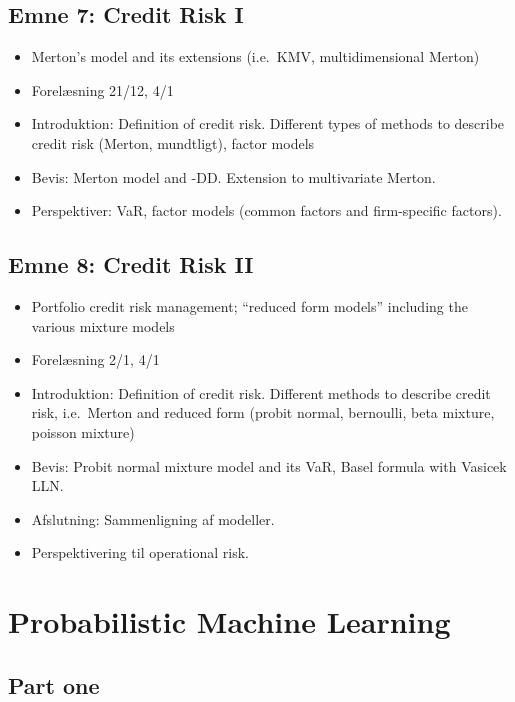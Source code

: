 \documentclass[
]{book}
\providecommand{\tightlist}{%
  \setlength{\itemsep}{0pt}\setlength{\parskip}{0pt}}
\begin{document}
\hypertarget{emne-7-credit-risk-i}{%
\section{Emne 7: Credit Risk I}\label{emne-7-credit-risk-i}}

\begin{itemize}
\tightlist
\item
  Merton's model and its extensions (i.e.~KMV, multidimensional Merton)
\item
  Forelæsning 21/12, 4/1
\item
  Introduktion: Definition of credit risk. Different types of methods to describe credit risk (Merton, mundtligt), factor models
\item
  Bevis: Merton model and -DD. Extension to multivariate Merton.
\item
  Perspektiver: VaR, factor models (common factors and firm-specific factors).
\end{itemize}

\hypertarget{emne-8-credit-risk-ii}{%
\section{Emne 8: Credit Risk II}\label{emne-8-credit-risk-ii}}

\begin{itemize}
\tightlist
\item
  Portfolio credit risk management; ``reduced form models'' including the various mixture models
\item
  Forelæsning 2/1, 4/1
\item
  Introduktion: Definition of credit risk. Different methods to describe credit risk, i.e.~Merton and reduced form (probit normal, bernoulli, beta mixture, poisson mixture)
\item
  Bevis: Probit normal mixture model and its VaR, Basel formula with Vasicek LLN.
\item
  Afslutning: Sammenligning af modeller.
\item
  Perspektivering til operational risk.
\end{itemize}

\hypertarget{probabilistic-machine-learning}{%
\chapter{Probabilistic Machine Learning}\label{probabilistic-machine-learning}}

\hypertarget{part-one}{%
\section{Part one}\label{part-one}}
\end{document}

